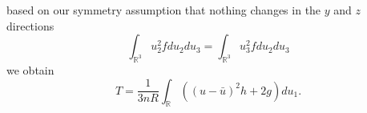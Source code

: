 %
based on our symmetry assumption that nothing changes in the $y$ and $z$ directions
%
\begin{equation*}
\int_{\mathbb{R}^3} u_2^2 f du_2 du_3 = \int_{\mathbb{R}^3} u_3^2 f du_2 du_3
\end{equation*}
%
we obtain
%
\begin{equation*}
T = \frac{1}{3 n R} \int_{\mathbb{R}} \left( (u - \bar{u})^2 h + 2 g \right) du_1.
\end{equation*}

